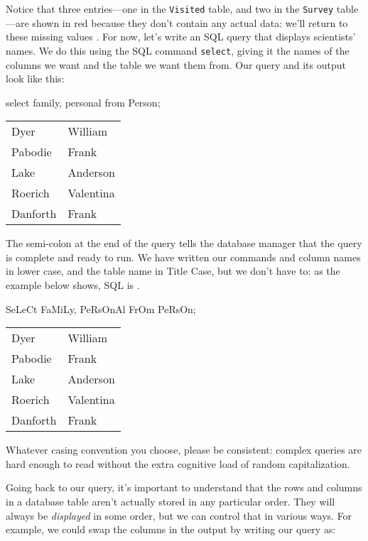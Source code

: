 \documentclass{book}
\begin{document}
Notice that three entries---one in the \texttt{Visited} table, and two
in the \texttt{Survey} table---are shown in red because they don't
contain any actual data: we'll return to these missing values
. For now, let's write an SQL query that
displays scientists' names. We do this using the SQL command
\texttt{select}, giving it the names of the columns we want and the
table we want them from. Our query and its output look like this:

\begin{VerbIn}
\end{VerbIn}

\begin{VerbIn}
select family, personal from Person;
\end{VerbIn}

\begin{tabular}{ll}
Dyer & William \\
Pabodie & Frank \\
Lake & Anderson \\
Roerich & Valentina \\
Danforth & Frank \\
\end{tabular}

The semi-colon at the end of the query tells the database manager that
the query is complete and ready to run. We have written our commands and
column names in lower case, and the table name in Title Case, but we
don't have to: as the example below shows, SQL is
.

\begin{VerbIn}
SeLeCt FaMiLy, PeRsOnAl FrOm PeRsOn;
\end{VerbIn}

\begin{tabular}{ll}
Dyer & William \\
Pabodie & Frank \\
Lake & Anderson \\
Roerich & Valentina \\
Danforth & Frank \\
\end{tabular}

Whatever casing convention you choose, please be consistent: complex
queries are hard enough to read without the extra cognitive load of
random capitalization.

Going back to our query, it's important to understand that the rows and
columns in a database table aren't actually stored in any particular
order. They will always be \emph{displayed} in some order, but we can
control that in various ways. For example, we could swap the columns in
the output by writing our query as:
\end{document}

